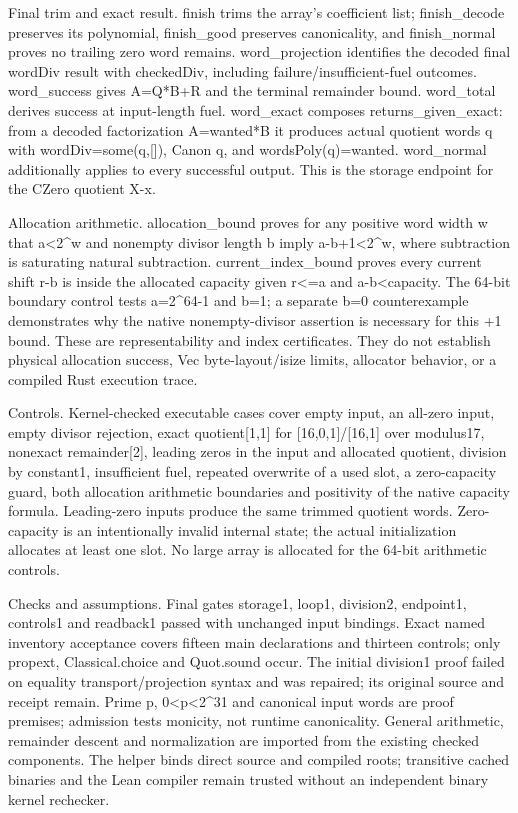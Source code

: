 \documentclass[10pt]{article}
\begin{document}
Final trim and exact result. finish trims the array's coefficient list; finish\_decode preserves its polynomial, finish\_good preserves canonicality, and finish\_normal proves no trailing zero word remains. word\_projection identifies the decoded final wordDiv result with checkedDiv, including failure/insufficient-fuel outcomes. word\_success gives A=Q*B+R and the terminal remainder bound. word\_total derives success at input-length fuel. word\_exact composes returns\_given\_exact: from a decoded factorization A=wanted*B it produces actual quotient words q with wordDiv=some(q,[]), Canon q, and wordsPoly(q)=wanted. word\_normal additionally applies to every successful output. This is the storage endpoint for the CZero quotient X-x.\par\medskip
Allocation arithmetic. allocation\_bound proves for any positive word width w that a<2\textasciicircum{}w and nonempty divisor length b imply a-b+1<2\textasciicircum{}w, where subtraction is saturating natural subtraction. current\_index\_bound proves every current shift r-b is inside the allocated capacity given r<=a and a-b<capacity. The 64-bit boundary control tests a=2\textasciicircum{}64-1 and b=1; a separate b=0 counterexample demonstrates why the native nonempty-divisor assertion is necessary for this +1 bound. These are representability and index certificates. They do not establish physical allocation success, Vec byte-layout/isize limits, allocator behavior, or a compiled Rust execution trace.\par\medskip
Controls. Kernel-checked executable cases cover empty input, an all-zero input, empty divisor rejection, exact quotient[1,1] for [16,0,1]/[16,1] over modulus17, nonexact remainder[2], leading zeros in the input and allocated quotient, division by constant1, insufficient fuel, repeated overwrite of a used slot, a zero-capacity guard, both allocation arithmetic boundaries and positivity of the native capacity formula. Leading-zero inputs produce the same trimmed quotient words. Zero-capacity is an intentionally invalid internal state; the actual initialization allocates at least one slot. No large array is allocated for the 64-bit arithmetic controls.\par\medskip
Checks and assumptions. Final gates storage1, loop1, division2, endpoint1, controls1 and readback1 passed with unchanged input bindings. Exact named inventory acceptance covers fifteen main declarations and thirteen controls; only propext, Classical.choice and Quot.sound occur. The initial division1 proof failed on equality transport/projection syntax and was repaired; its original source and receipt remain. Prime p, 0<p<2\textasciicircum{}31 and canonical input words are proof premises; admission tests monicity, not runtime canonicality. General arithmetic, remainder descent and normalization are imported from the existing checked components. The helper binds direct source and compiled roots; transitive cached binaries and the Lean compiler remain trusted without an independent binary kernel rechecker.\par\medskip
\end{document}
